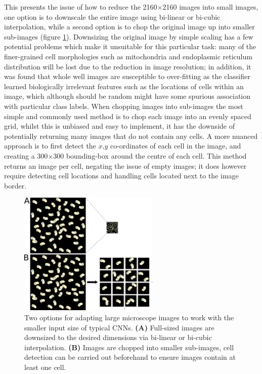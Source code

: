 \documentclass[a4paper,11pt,twoside,openright]{scrbook}
\begin{document}
This presents the issue of how to reduce the 2160$\times$2160 images into small images, one option is to downscale the entire image using bi-linear or bi-cubic interpolation, while a second option is to chop the original image up into smaller sub-images (figure \ref{figure:image_chopping}).
Downsizing the original image by simple scaling has a few potential problems which make it unsuitable for this particular task:
    many of the finer-grained cell morphologies such as mitochondria and endoplasmic reticulum distribution will be lost due to the reduction in image resolution;
    in addition, it was found that whole well images are susceptible to over-fitting as the classifier learned biologically irrelevant features such as the locations of cells within an image, which although should be random might have some spurious association with particular class labels.
When chopping images into sub-images the most simple and commonly used method is to chop each image into an evenly spaced grid, whilst this is unbiased and easy to implement, it has the downside of potentially returning many images that do not contain any cells.
A more nuanced approach is to first detect the $x$,$y$ co-ordinates of each cell in the image, and creating a 300$\times$300 bounding-box around the centre of each cell.
This method returns an image per cell, negating the issue of empty images; it does however require detecting cell locations and handling cells located next to the image border.

\begin{figure}
    \includegraphics[width=0.6\textwidth]{ch2ImageChopping}
    \captionsetup{width=0.8\textwidth}
    \caption[Down-sizing and chopping images for CNN training]{Two options for adapting large microscope images to work with the smaller input size of typical CNNs. \textbf{(A)} Full-sized images are downsized to the desired dimensions via bi-linear or bi-cubic interpolation. \textbf{(B)} Images are chopped into smaller sub-images, cell detection can be carried out beforehand to ensure images contain at least one cell.}
    \label{figure:image_chopping}
\end{figure}
\end{document}
